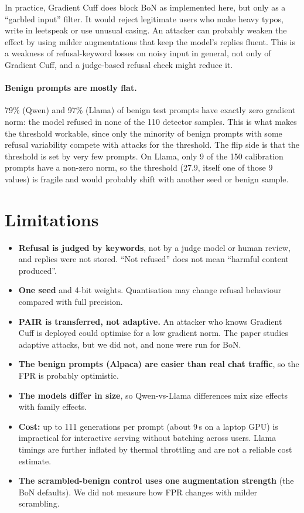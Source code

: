 \documentclass[11pt,a4paper]{article}
\begin{document}
In practice, Gradient Cuff does block BoN as implemented here, but only as a ``garbled input'' filter. It would reject legitimate users who make heavy typos, write in leetspeak or use unusual casing. An attacker can probably weaken the effect by using milder augmentations that keep the model's replies fluent. This is a weakness of refusal-keyword losses on noisy input in general, not only of Gradient Cuff, and a judge-based refusal check might reduce it.

\paragraph{Benign prompts are mostly flat.} 79\% (Qwen) and 97\% (Llama) of benign test prompts have exactly zero gradient norm: the model refused in none of the 110 detector samples. This is what makes the threshold workable, since only the minority of benign prompts with some refusal variability compete with attacks for the threshold. The flip side is that the threshold is set by very few prompts. On Llama, only 9 of the 150 calibration prompts have a non-zero norm, so the threshold (27.9, itself one of those 9 values) is fragile and would probably shift with another seed or benign sample.

\section{Limitations}

\begin{itemize}
  \item \textbf{Refusal is judged by keywords}, not by a judge model or human review, and replies were not stored. ``Not refused'' does not mean ``harmful content produced''.
  \item \textbf{One seed} and 4-bit weights. Quantisation may change refusal behaviour compared with full precision.
  \item \textbf{PAIR is transferred, not adaptive.} An attacker who knows Gradient Cuff is deployed could optimise for a low gradient norm. The paper studies adaptive attacks, but we did not, and none were run for BoN.
  \item \textbf{The benign prompts (Alpaca) are easier than real chat traffic}, so the FPR is probably optimistic.
  \item \textbf{The models differ in size}, so Qwen-vs-Llama differences mix size effects with family effects.
  \item \textbf{Cost:} up to 111 generations per prompt (about 9\,s on a laptop GPU) is impractical for interactive serving without batching across users. Llama timings are further inflated by thermal throttling and are not a reliable cost estimate.
  \item \textbf{The scrambled-benign control uses one augmentation strength} (the BoN defaults). We did not measure how FPR changes with milder scrambling.
\end{itemize}
\end{document}
